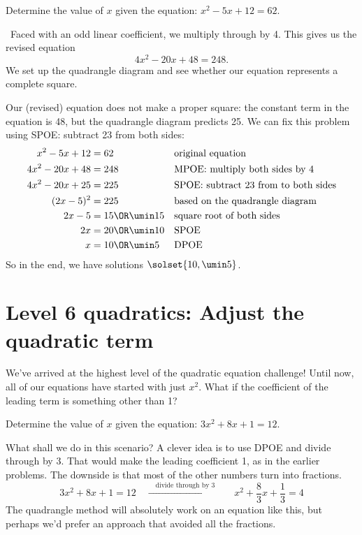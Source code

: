 \begin{boxex}
Determine the value of $x$ given the equation: $x^2-5x+12=62$.

\exsoln\ Faced with an odd linear coefficient, we multiply through by 4. This gives us the revised equation \[4x^2-20x+48=248.\] We set up the quadrangle diagram and see whether our equation represents a complete square.


Our (revised) equation does not make a proper square: the constant term in the equation is 48, but the quadrangle diagram predicts 25. We can fix this problem using SPOE: subtract 23 from both sides:
\begin{align*}
x^2 - 5x + 12 &= 62
&&\text{original equation}
\\
4x^2 - 20x + 48 &= 248
&&\text{MPOE: multiply both sides by 4}
\\
4x^2 - 20x + 25 &= 225
&&\text{SPOE: subtract 23 from to both sides}
\\
(2x-5)^2 &= 225
&&\text{based on the quadrangle diagram}
\\
2x-5 &= 15 \OR \umin15
&&\text{square root of both sides}
\\
2x &= 20 \OR \umin10
&&\text{SPOE}
\\
x &= 10 \OR \umin5
&&\text{DPOE}
\end{align*}
So in the end, we have solutions $\solset{10, \umin5}$.
\end{boxex}

\section{Level 6 quadratics: Adjust the quadratic term}

We've arrived at the highest level of the quadratic equation challenge! Until now, all of our equations have started with just $x^2$. What if the coefficient of the leading term is something other than 1?

\begin{boxexplore}
Determine the value of $x$ given the equation: $3x^2 + 8x + 1 = 12$.
\end{boxexplore} %

What shall we do in this scenario? A clever idea is to use DPOE and divide through by 3. That would make the leading coefficient 1, as in the earlier problems. The downside is that most of the other numbers turn into fractions.
\[3x^2 + 8x + 1 = 12
\quad\xrightarrow{\quad\text{divide through by 3}\quad}\quad
x^2 + \frac{8}{3}x + \frac{1}{3} = 4\]
The quadrangle method will absolutely work on an equation like this, but perhaps we'd prefer an approach that avoided all the fractions.

